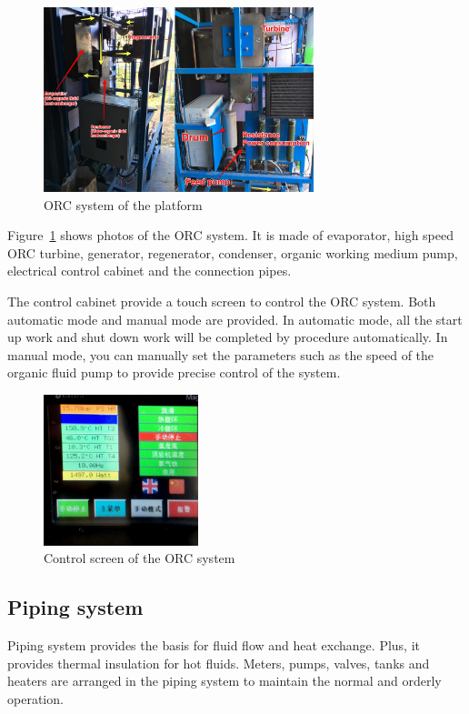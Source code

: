 \begin{figure}[!ht]
\centering
\includegraphics[width=0.7\textwidth]{fig/ORCsystem.jpg}
\caption{ORC system of the platform}\label{fig:ORCsystem}
\end{figure}
Figure~\ref{fig:ORCsystem} shows photos of the ORC system. It is made of evaporator, high speed ORC turbine, generator, regenerator, condenser, organic working medium pump, electrical control cabinet and the connection pipes.

The control cabinet provide a touch screen to control the ORC system. Both automatic mode and manual mode are provided. In automatic mode, all the start up work and shut down work will be completed by procedure automatically. In manual mode, you can manually set the parameters such as the speed of the organic fluid pump to provide precise control of the system.

\begin{figure}[!ht]
\centering
\includegraphics[width=0.4\textwidth]{fig/ControlCabinet}
\caption{Control screen of the ORC system}\label{fig:ControlCabinet}
\end{figure}

\subsection{Piping system}

Piping system provides the basis for fluid flow and heat exchange. Plus, it provides thermal insulation for hot fluids. Meters, pumps, valves, tanks and heaters are arranged in the piping system to maintain the normal and orderly operation.

